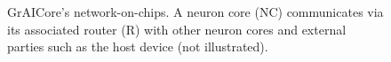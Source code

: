 \begin{figure}[htbp]
    \centering
    \hfill
    \caption{GrAICore's network-on-chips. A neuron core (NC) communicates via its associated router (R) with other neuron cores and external parties such as the host device (not illustrated).}
    \label{fig:noc}
\end{figure}

